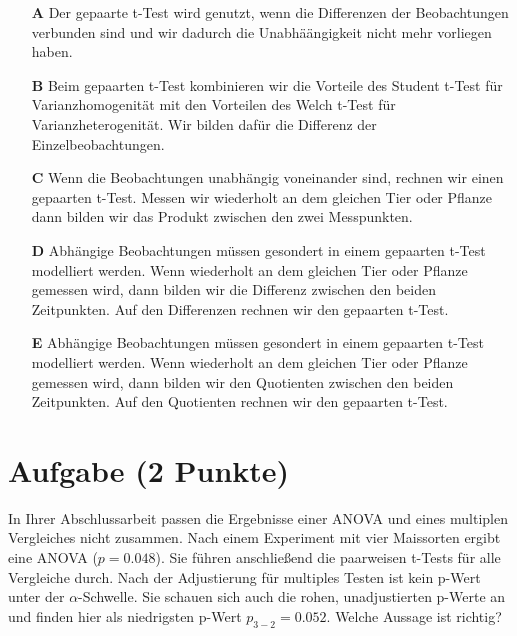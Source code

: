 \documentclass[a4paper, 9pt]{scrartcl}\usepackage[]{graphicx}\usepackage[]{xcolor}
\begin{document}
\begin{enumerate}
\item [\textbf{A} \msquare] Der gepaarte t-Test wird genutzt, wenn die Differenzen der Beobachtungen verbunden sind und wir dadurch die Unabhäängigkeit nicht mehr vorliegen haben.
\item [\textbf{B} \msquare] Beim gepaarten t-Test kombinieren wir die Vorteile des Student t-Test für Varianzhomogenität mit den Vorteilen des Welch t-Test für Varianzheterogenität. Wir bilden dafür die Differenz der Einzelbeobachtungen.
\item [\textbf{C} \msquare] Wenn die Beobachtungen unabhängig voneinander sind, rechnen wir einen gepaarten t-Test. Messen wir wiederholt an dem gleichen Tier oder Pflanze dann bilden wir das Produkt zwischen den zwei Messpunkten.
\item [\textbf{D} \msquare] Abhängige Beobachtungen müssen gesondert in einem gepaarten t-Test modelliert werden. Wenn wiederholt an dem gleichen Tier oder Pflanze gemessen wird, dann bilden wir die Differenz zwischen den beiden Zeitpunkten. Auf den Differenzen rechnen wir den gepaarten t-Test.
\item [\textbf{E} \msquare] Abhängige Beobachtungen müssen gesondert in einem gepaarten t-Test modelliert werden. Wenn wiederholt an dem gleichen Tier oder Pflanze gemessen wird, dann bilden wir den Quotienten zwischen den beiden Zeitpunkten. Auf den Quotienten rechnen wir den gepaarten t-Test.
\end{enumerate}

\section{Aufgabe \hfill (2 Punkte)}



In Ihrer Abschlussarbeit passen die Ergebnisse einer ANOVA und eines multiplen Vergleiches nicht zusammen. Nach einem Experiment mit vier Maissorten ergibt eine ANOVA ($p = 0.048$). Sie führen anschließend die paarweisen t-Tests für alle Vergleiche durch. Nach der Adjustierung für multiples Testen ist kein p-Wert unter der $\alpha$-Schwelle. Sie schauen sich auch die rohen, unadjustierten p-Werte an und finden hier als niedrigsten p-Wert $p_{3-2} = 0.052$. Welche Aussage ist richtig?
\end{document}
